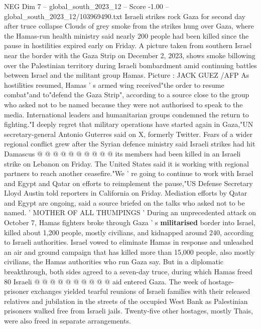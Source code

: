 \begin{textsample}{NEG Dim 7 – global\_south\_2023\_12 – Score -1.00 – global\_south\_2023\_12/103969490.txt}  \label{ex:f7_neg_198}
Israeli strikes rock Gaza for second day after truce collapse Clouds of grey smoke from the strikes hung over Gaza, where the Hamas-run health ministry said nearly 200 people had been killed since the pause in hostilities expired early on Friday.
A picture taken from southern Israel near the border with the Gaza Strip on December 2, 2023, shows smoke billowing over the Palestinian territory during Israeli bombardment amid continuing battles between Israel and the militant group Hamas.
Picture : JACK GUEZ /AFP As hostilities resumed, Hamas ' s armed wing received"the order to resume combat"and to"defend the Gaza Strip", according to a source close to the group who asked not to be named because they were not authorised to speak to the media.
International leaders and humanitarian groups condemned the return to fighting."I deeply regret that military operations have started again in Gaza,"UN secretary-general Antonio Guterres said on X, formerly Twitter.
Fears of a wider regional conflict grew after the Syrian defence ministry said Israeli strikes had hit Damascus @ @ @ @ @ @ @ @ @ @ its members had been killed in an Israeli strike on Lebanon on Friday.
The United States said it is working with regional partners to reach another ceasefire."We ' re going to continue to work with Israel and Egypt and Qatar on efforts to reimplement the pause,"US Defense Secretary Lloyd Austin told reporters in California on Friday.
Mediation efforts by Qatar and Egypt are ongoing, said a source briefed on the talks who asked not to be named. ' MOTHER OF ALL THUMPINGS ' During an unprecedented attack on October 7, Hamas fighters broke through Gaza ' s \textbf{militarised} border into Israel, killed about 1,200 people, mostly civilians, and kidnapped around 240, according to Israeli authorities.
Israel vowed to eliminate Hamas in response and unleashed an air and ground campaign that has killed more than 15,000 people, also mostly civilians, the Hamas authorities who run Gaza say.
But in a diplomatic breakthrough, both sides agreed to a seven-day truce, during which Hamas freed 80 Israeli @ @ @ @ @ @ @ @ @ @ aid entered Gaza.
The week of hostage-prisoner exchanges yielded tearful reunions of Israeli families with their released relatives and jubilation in the streets of the occupied West Bank as Palestinian prisoners walked free from Israeli jails.
Twenty-five other hostages, mostly Thais, were also freed in separate arrangements.

\end{textsample}
